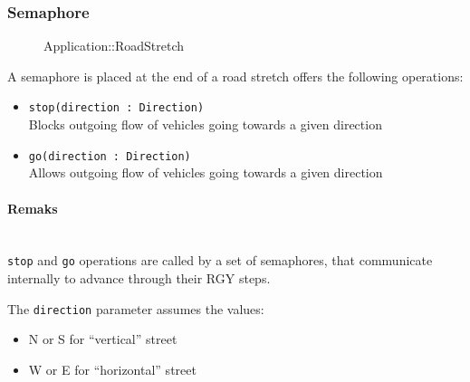 \subsubsection{Semaphore}
\begin{figure}[h]
\centering
{}
\caption{Application::RoadStretch}
\end{figure}
\FloatBarrier
A semaphore is placed at the end of a road stretch offers the following operations:
\begin{itemize}
	\item \texttt{stop(direction : Direction)}
	\\Blocks outgoing flow of vehicles going towards a given direction
	\item \texttt{go(direction : Direction)}
	\\Allows outgoing flow of vehicles going towards a given direction
\end{itemize}
\paragraph{Remaks}
\ \\\texttt{stop} and \texttt{go} operations are called by a set of semaphores, that communicate internally to advance through their RGY steps.

The \texttt{direction} parameter assumes the values:
\begin{itemize}
	\item N or S  for “vertical” street
	\item W or E for “horizontal” street
\end{itemize}